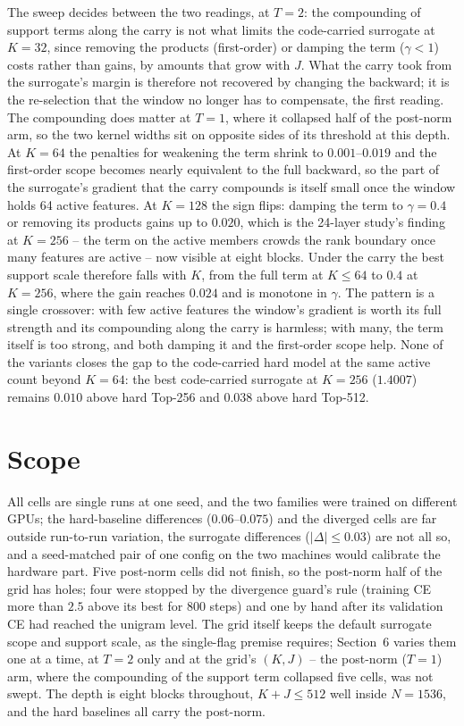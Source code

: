 \documentclass[11pt,a4paper]{article}
\begin{document}
The sweep decides between the two readings, at $T=2$: the compounding of
support terms along the carry is not what limits the code-carried surrogate
at $K=32$, since removing the products (first-order) or damping the term
($\gamma < 1$) costs rather than gains, by amounts that grow with $J$. What
the carry took from the surrogate's margin is therefore not recovered by
changing the backward; it is the re-selection that the window no longer has
to compensate, the first reading. The compounding does matter at $T = 1$,
where it collapsed half of the post-norm arm, so the two kernel widths sit
on opposite sides of its threshold at this depth. At $K = 64$ the
penalties for weakening the term shrink to $0.001$--$0.019$ and the
first-order scope becomes nearly equivalent to the full backward, so the
part of the surrogate's gradient that the carry compounds is itself small
once the window holds 64 active features. At $K = 128$ the sign flips:
damping the term to $\gamma = 0.4$ or removing its products gains up to
$0.020$, which is the 24-layer study's finding at $K = 256$ -- the term on
the active members crowds the rank boundary once many features are active
-- now visible at eight blocks. Under the carry the best support scale
therefore falls with $K$, from the full term at $K \le 64$ to $0.4$ at
$K = 256$, where the gain reaches $0.024$ and is monotone in $\gamma$. The
pattern is a single crossover: with few active features the window's
gradient is worth its full strength and its compounding along the carry is
harmless; with many, the term itself is too strong, and both damping it and
the first-order scope help. None of the variants closes the gap to the
code-carried hard model at the same active count beyond $K = 64$: the best
code-carried surrogate at $K = 256$ ($1.4007$) remains $0.010$ above hard
Top-256 and $0.038$ above hard Top-512.

\section{Scope}

All cells are single runs at one seed, and the two families were trained on
different GPUs; the hard-baseline differences ($0.06$--$0.075$) and the
diverged cells are far outside run-to-run variation, the surrogate
differences ($|{\Delta}| \le 0.03$) are not all so, and a seed-matched pair
of one config on the two machines would calibrate the hardware part. Five
post-norm cells did not finish, so the post-norm half of the grid has holes;
four were stopped by the divergence guard's rule (training CE more than
$2.5$ above its best for 800 steps) and one by hand after its validation CE
had reached the unigram level. The grid itself keeps the default surrogate
scope and support scale, as the single-flag premise requires; Section~6
varies them one at a time, at $T = 2$ only and at the grid's $(K, J)$ --
the post-norm ($T = 1$) arm, where the compounding of the support term
collapsed five cells, was not swept. The depth is eight blocks throughout,
$K + J \le 512$ well inside $N = 1536$, and the hard baselines all carry the
post-norm.
\end{document}
